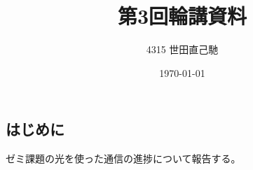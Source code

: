 \documentclass[a4paper,12pt]{article}
\title{第3回輪講資料}
\date{\today}
\author{4315 世田直己馳}
\begin{document}
 
\maketitle

\begin{multicols}{2}
\section{はじめに}
ゼミ課題の光を使った通信の進捗について報告する。

\end{multicols}
\end{document}
